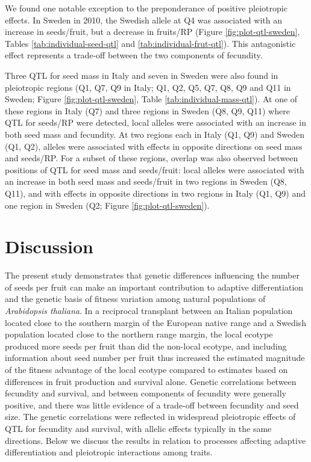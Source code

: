 \documentclass[
]{article}
\begin{document}
We found one notable exception to the preponderance of positive pleiotropic effects. In Sweden in 2010, the Swedish allele at Q4 was associated with an increase in seeds/fruit, but a decrease in fruits/RP (Figure \ref{fig:plot-qtl-sweden}, Tables \ref{tab:individual-seed-qtl} and \ref{tab:individual-frut-qtl}). This antagonistic effect represents a trade-off between the two components of fecundity.

Three QTL for seed mass in Italy and seven in Sweden were also found in pleiotropic regions (Q1, Q7, Q9 in Italy; Q1, Q2, Q5, Q7, Q8, Q9 and Q11 in Sweden; Figure \ref{fig:plot-qtl-sweden}, Table \ref{tab:individual-mass-qtl}). At one of these regions in Italy (Q7) and three regions in Sweden (Q8, Q9, Q11) where QTL for seeds/RP were detected, local alleles were associated with an increase in both seed mass and fecundity. At two regions each in Italy (Q1, Q9) and Sweden (Q1, Q2), alleles were associated with effects in opposite directions on seed mass and seeds/RP. For a subset of these regions, overlap was also observed between positions of QTL for seed mass and seeds/fruit: local alleles were associated with an increase in both seed mass and seeds/fruit in two regions in Sweden (Q8, Q11), and with effects in opposite directions in two regions in Italy (Q1, Q9) and one region in Sweden (Q2; Figure \ref{fig:plot-qtl-sweden}).

\hypertarget{discussion}{%
\section{Discussion}\label{discussion}}

The present study demonstrates that genetic differences influencing the number of seeds per fruit can make an important contribution to adaptive differentiation and the genetic basis of fitness variation among natural populations of \emph{Arabidopsis thaliana}. In a reciprocal transplant between an Italian population located close to the southern margin of the European native range and a Swedish population located close to the northern range margin, the local ecotype produced more seeds per fruit than did the non-local ecotype, and including information about seed number per fruit thus increased the estimated magnitude of the fitness advantage of the local ecotype compared to estimates based on differences in fruit production and survival alone. Genetic correlations between fecundity and survival, and between components of fecundity were generally positive, and there was little evidence of a trade-off between fecundity and seed size. The genetic correlations were reflected in widespread pleiotropic effects of QTL for fecundity and survival, with allelic effects typically in the same directions. Below we discuss the results in relation to processes affecting adaptive differentiation and pleiotropic interactions among traits.
\end{document}
